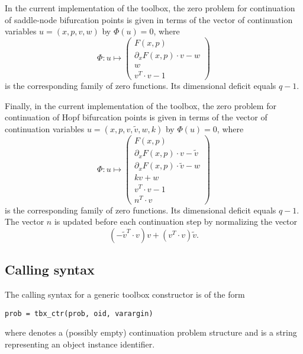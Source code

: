 In the current implementation of the  toolbox, the zero problem for continuation of saddle-node bifurcation points is given in terms of the vector of continuation variables $u=(x,p,v,w)$ by $\Phi(u)=0$, where
\begin{equation}
\Phi:u\mapsto \begin{pmatrix} F(x,p)\\\partial_x F(x,p)\cdot v-w\\w\\v^T\cdot v-1\end{pmatrix}
\label{eq: sn}
\end{equation}
is the corresponding family of zero functions. Its dimensional deficit equals $q-1$.

Finally, in the current implementation of the  toolbox, the zero problem for continuation of Hopf bifurcation points is given in terms of the vector of continuation variables $u=(x,p,v,\tilde{v},w,k)$ by $\Phi(u)=0$, where
\begin{equation}
\Phi:u\mapsto \begin{pmatrix} F(x,p)\\\partial_x F(x,p)\cdot v-\tilde{v}\\\partial_x F(x,p)\cdot \tilde{v}-w\\kv+w\\v^T\cdot v-1\\n^T\cdot v\end{pmatrix}
\label{eq: hb}
\end{equation}
is the corresponding family of zero functions. Its dimensional deficit equals $q-1$. The vector $n$ is updated before each continuation step by normalizing the vector
\begin{equation}
(-\tilde{v}^T\cdot v) v+(v^T\cdot v) \tilde{v}.
\end{equation}

\subsection{Calling syntax}
The calling syntax for a generic  toolbox constructor  is of the form
\begin{lstlisting}[language=coco-highlight]
prob = tbx_ctr(prob, oid, varargin)
\end{lstlisting}
where  denotes a (possibly empty) continuation problem structure and  is a string representing an object instance identifier.

